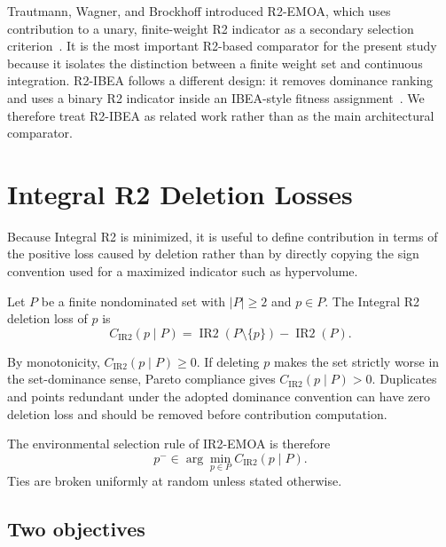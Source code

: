 \documentclass[runningheads]{llncs}
\newcommand{\IR}{\operatorname{IR2}}
\newcommand{\cIR}{C_{\IR}}
\begin{document}
Trautmann, Wagner, and Brockhoff introduced R2-EMOA, which uses contribution to a unary, finite-weight R2 indicator as a secondary selection criterion~\cite{TrautmannWagnerBrockhoff2013}. It is the most important R2-based comparator for the present study because it isolates the distinction between a finite weight set and continuous integration. R2-IBEA follows a different design: it removes dominance ranking and uses a binary R2 indicator inside an IBEA-style fitness assignment~\cite{PhanSuzuki2013}. We therefore treat R2-IBEA as related work rather than as the main architectural comparator.

\section{Integral R2 Deletion Losses}
\label{sec:contributions}

Because Integral R2 is minimized, it is useful to define contribution in terms of the positive loss caused by deletion rather than by directly copying the sign convention used for a maximized indicator such as hypervolume.

\begin{definition}
Let $P$ be a finite nondominated set with $|P|\ge2$ and $p\in P$. The Integral R2 deletion loss of $p$ is
\begin{equation}
\label{eq:deletion-loss}
    \cIR(p\mid P)
    =\IR(P\setminus\{p\})-\IR(P).
\end{equation}
\end{definition}

By monotonicity, $\cIR(p\mid P)\ge0$. If deleting $p$ makes the set strictly worse in the set-dominance sense, Pareto compliance gives $\cIR(p\mid P)>0$. Duplicates and points redundant under the adopted dominance convention can have zero deletion loss and should be removed before contribution computation.

The environmental selection rule of IR2-EMOA is therefore
\begin{equation}
\label{eq:least-ir2}
    p^-\in\arg\min_{p\in P}\cIR(p\mid P).
\end{equation}
Ties are broken uniformly at random unless stated otherwise.

\subsection{Two objectives}
\label{subsec:2d}
\end{document}
